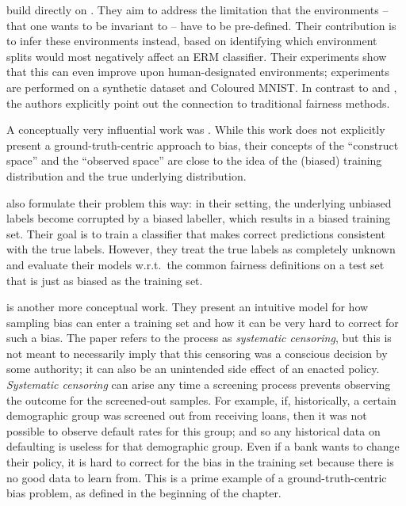 \citet{creager2020environment} build directly on \citet{arjovsky2019invariant}.
They aim to address the limitation that the environments -- that one wants to be invariant to -- have to be pre-defined.
Their contribution is to infer these environments instead,
based on identifying which environment splits would most negatively affect an \ac{ERM} classifier.
Their experiments show that this can even improve upon human-designated environments;
experiments are performed on a synthetic dataset and Coloured MNIST.
In contrast to \citet{kim2019learning} and \citet{arjovsky2019invariant},
the authors explicitly point out the connection to traditional fairness methods.

A conceptually very influential work was \citet{friedler2016possibility}.
While this work does not explicitly present a ground-truth-centric approach to bias,
their concepts of the ``construct space'' and the ``observed space'' are close
to the idea of the (biased) training distribution and the true underlying distribution.

\citet{jiang2020identifying} also formulate their problem this way:
in their setting, the underlying unbiased labels become corrupted by a biased labeller,
which results in a biased training set.
Their goal is to train a classifier that makes correct predictions consistent with the true labels.
However, they treat the true labels as completely unknown
and evaluate their models w.r.t.\ the common fairness definitions on a test set
that is just as biased as the training set.

\citet{kallus2018residual} is another more conceptual work.
They present an intuitive model for how sampling bias can enter a training set
and how it can be very hard to correct for such a bias.
The paper refers to the process as \emph{systematic censoring},
but this is not meant to necessarily imply that this censoring was a conscious decision by some authority;
it can also be an unintended side effect of an enacted policy.
\emph{Systematic censoring} can arise any time a screening process prevents observing the outcome for the screened-out samples.
For example, if, historically, a certain demographic group was screened out from receiving loans,
then it was not possible to observe default rates for this group;
and so any historical data on defaulting is useless for that demographic group.
Even if a bank wants to change their policy,
it is hard to correct for the bias in the training set because there is no good data to learn from.
This is a prime example of a ground-truth-centric bias problem,
as defined in the beginning of the chapter.

